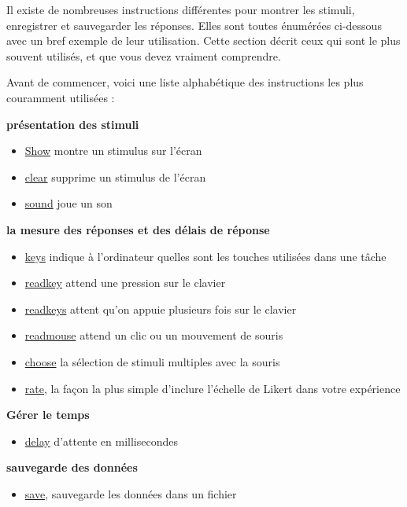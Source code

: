 \documentclass[
]{book}
\providecommand{\tightlist}{%
  \setlength{\itemsep}{0pt}\setlength{\parskip}{0pt}}
\begin{document}
Il existe de nombreuses instructions différentes pour montrer les stimuli, enregistrer et sauvegarder les réponses. Elles sont toutes énumérées ci-dessous avec un bref exemple de leur utilisation. Cette section décrit ceux qui sont le plus souvent utilisés, et que vous devez vraiment comprendre.

Avant de commencer, voici une liste alphabétique des instructions les plus couramment utilisées :

\textbf{présentation des stimuli}

\begin{itemize}
\tightlist
\item
  \protect\hyperlink{task-show}{Show} montre un stimulus sur l'écran
\item
  \protect\hyperlink{task-clear}{clear} supprime un stimulus de l'écran
\item
  \protect\hyperlink{task-sound}{sound} joue un son
\end{itemize}

\textbf{la mesure des réponses et des délais de réponse}

\begin{itemize}
\tightlist
\item
  \protect\hyperlink{task-keys}{keys} indique à l'ordinateur quelles sont les touches utilisées dans une tâche
\item
  \protect\hyperlink{task-readkey}{readkey} attend une pression sur le clavier
\item
  \protect\hyperlink{task-readkeys}{readkeys} attent qu'on appuie plusieurs fois sur le clavier
\item
  \protect\hyperlink{task-readkeys}{readmouse} attend un clic ou un mouvement de souris
\item
  \protect\hyperlink{task-choose}{choose} la sélection de stimuli multiples avec la souris
\item
  \protect\hyperlink{task-rate}{rate}, la façon la plus simple d'inclure l'échelle de Likert dans votre expérience
\end{itemize}

\textbf{Gérer le temps}

\begin{itemize}
\tightlist
\item
  \protect\hyperlink{task-delay}{delay} d'attente en millisecondes
\end{itemize}

\textbf{sauvegarde des données}

\begin{itemize}
\tightlist
\item
  \protect\hyperlink{task-save}{save}, sauvegarde les données dans un fichier
\end{itemize}
\end{document}
